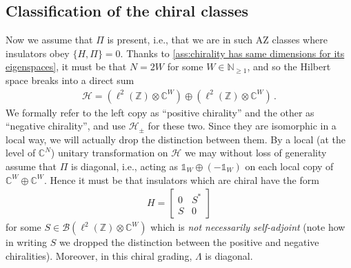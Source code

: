 \documentclass[a4paper,10pt]{article}
\numberwithin{equation}{section}
\theoremstyle{plain}
\theoremstyle{plain}
\theoremstyle{plain}
\theoremstyle{plain}
\theoremstyle{plain}
\theoremstyle{remark}
\theoremstyle{definition}
\theoremstyle{plain}
\newcommand{\ZZ}{\mathbb{Z}}
\newcommand{\NN}{\mathbb{N}}
\newcommand{\CC}{\mathbb{C}}
\newcommand{\calB}{\mathcal{B}}
\newcommand{\calH}{\mathcal{H}}
\newcommand{\Id}{\mathds{1}}
\newcommand{\eq}[1]{\begin{align*}#1\end{align*}}
\begin{document}
	\subsection{Classification of the chiral classes}
	Now we assume that $\Pi$ is present, i.e., that we are in such AZ classes where insulators obey $\{H,\Pi\}=0$. Thanks to \cref{ass:chirality has same dimensions for its eigenspaces}, it must be that $N=2W$ for some $W\in\NN_{\geq1}$, and so the Hilbert space breaks into a direct sum \eq{
		\calH = \left(\ell^2(\ZZ)\otimes\CC^W\right)\oplus\left(\ell^2(\ZZ)\otimes\CC^W\right)\,.
	} We formally refer to the left copy as ``positive chirality'' and the other as ``negative chirality'', and use $\calH_{\pm}$ for these two. Since they are isomorphic in a local way, we will actually drop the distinction between them. By a local (at the level of $\CC^N$) unitary transformation on $\calH$ we may without loss of generality assume that $\Pi$ is diagonal, i.e., acting as $\Id_W\oplus(-\Id_W)$ on each local copy of $\CC^W\oplus\CC^W$. Hence it must be that insulators which are chiral have the form \eq{ H = \begin{bmatrix}
			0 & S^\ast \\
			S & 0
	\end{bmatrix}} for some $S\in\calB(\ell^2(\ZZ)\otimes\CC^W)$ which is \emph{not necessarily self-adjoint} (note how in writing $S$ we dropped the distinction between the positive and negative chiralities). Moreover, in this chiral grading, $\Lambda$ is diagonal.
	
\end{document}
